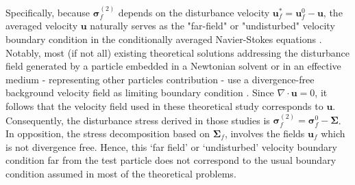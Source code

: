 Specifically, because $\bm\sigma_f^{(2)}$ depends on the disturbance velocity $\textbf{u}_f^* = \textbf{u}_f^0 - \textbf{u}$, the averaged velocity $\textbf{u}$ naturally serves as the "far-field" or "undisturbed" velocity boundary condition in the conditionally averaged Navier-Stokes equations \citep{hinch1977averaged,fintzi2025}. %
Notably, most (if not all) existing theoretical solutions addressing the disturbance field generated by a particle embedded in a Newtonian solvent or in an effective medium - representing other particles contribution - use a divergence-free background velocity field as limiting boundary condition \citep{hinch1977averaged, kim1985modelling}. 
Since $\nabla \cdot \textbf{u} = 0$, it follows that the velocity field used in these theoretical study corresponds to $\textbf{u}$. 
Consequently, the disturbance stress derived in those studies is $\bm\sigma_f^{(2)} = \bm\sigma_f^0 - \bm\Sigma$.
In opposition, the stress decomposition based on $\bm\Sigma_f$, involves the fields $\textbf{u}_f$ which is not divergence free. 
Hence, this `far field' or `undisturbed' velocity boundary condition far from the test particle does not correspond to the usual boundary condition assumed in most of the theoretical problems. 
